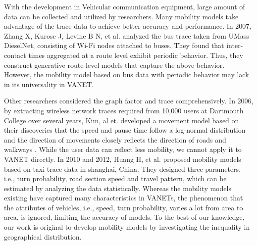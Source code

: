 With the development in Vehicular communication equipment, large amount of data can be collected and utilized by researchers. Many mobility models take advantage of the trace data to achieve better accuracy and performance. In 2007, Zhang X, Kurose J, Levine B N, et al. \cite{ZhangKurose-98} analyzed the bus trace taken from UMass DieselNet, consisting of Wi-Fi nodes attached to buses. They found that inter-contact times aggregated at a route level exhibit periodic behavior. Thus, they construct generative route-level models that capture the above behavior. However, the mobility model based on bus data with periodic behavior may lack in its universality in VANET.

Other researchers considered the graph factor and trace comprehensively. In 2006, by extracting wireless network traces required from 10,000 users at Dartmouth College over several years, Kim, al et. \cite{KimKotz-99} developed a movement model based on their discoveries that the speed and pause time follow a log-normal distribution and the direction of movements closely reflects the direction of roads and walkways \cite{KimKotz-99}. While the user data can reflect less mobility, we cannot apply it to VANET directly. In 2010 and 2012, Huang H, et al. \cite{HuangZhu-88,HuangZhang-105} proposed mobility models based on taxi trace data in shanghai, China. They designed three parameters, i.e., turn probability, road section speed and travel pattern, which can be estimated by analyzing the data statistically.
Whereas the mobility models existing have captured many characteristics in VANETs, the phenomenon that the attributes of vehicles, i.e., speed, turn probability, varies a lot from area to area, is ignored, limiting the accuracy of models. To the best of our knowledge, our work is original to develop mobility models by investigating the inequality in geographical distribution.


